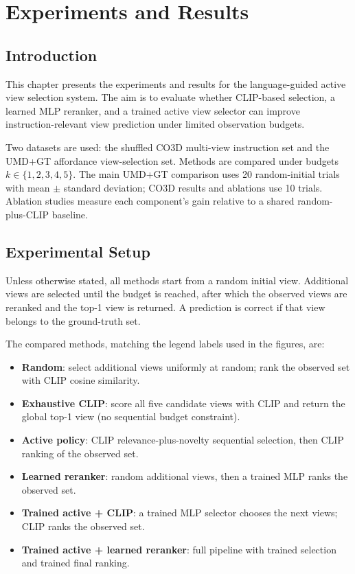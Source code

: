 \chapter{Experiments and Results}
\label{chap:experiments-results}

\section{Introduction}

This chapter presents the experiments and results for the language-guided active view selection system. The aim is to evaluate whether CLIP-based selection, a learned MLP reranker, and a trained active view selector can improve instruction-relevant view prediction under limited observation budgets.

Two datasets are used: the shuffled CO3D multi-view instruction set and the UMD+GT affordance view-selection set. Methods are compared under budgets \(k \in \{1,2,3,4,5\}\). The main UMD+GT comparison uses 20 random-initial trials with mean \(\pm\) standard deviation; CO3D results and ablations use 10 trials. Ablation studies measure each component's gain relative to a shared random-plus-CLIP baseline.

\section{Experimental Setup}

Unless otherwise stated, all methods start from a random initial view. Additional views are selected until the budget is reached, after which the observed views are reranked and the top-1 view is returned. A prediction is correct if that view belongs to the ground-truth set.

The compared methods, matching the legend labels used in the figures, are:

\begin{itemize}
    \item \textbf{Random}: select additional views uniformly at random; rank the observed set with CLIP cosine similarity.
    \item \textbf{Exhaustive CLIP}: score all five candidate views with CLIP and return the global top-1 view (no sequential budget constraint).
    \item \textbf{Active policy}: CLIP relevance-plus-novelty sequential selection, then CLIP ranking of the observed set.
    \item \textbf{Learned reranker}: random additional views, then a trained MLP ranks the observed set.
    \item \textbf{Trained active + CLIP}: a trained MLP selector chooses the next views; CLIP ranks the observed set.
    \item \textbf{Trained active + learned reranker}: full pipeline with trained selection and trained final ranking.
\end{itemize}

